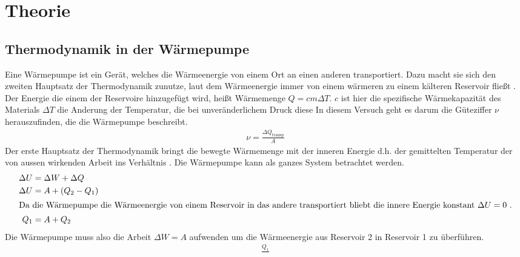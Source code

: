 \section{Theorie}

\subsection{Thermodynamik in der Wärmepumpe}
Eine Wärmepumpe ist ein Gerät, welches die Wärmeenergie von einem Ort an einen anderen transportiert.
Dazu macht sie sich den zweiten Hauptsatz der Thermodynamik zunutze, laut dem Wärmeenergie immer von einem 
wärmeren zu einem kälteren Reservoir fließt \cite[vgl][S. 321]{demtroeder}. 
Der Energie die einem der Reservoire hinzugefügt wird, heißt Wärmemenge $ Q = c m \Delta T $. %
$ c $ ist hier die spezifische Wärmekapazität des Materials $\Delta T $ die Anderung der Temperatur, 
die bei unveränderlichem Druck diese 
In diesem Versuch geht es darum die Güteziffer $ \nu $
herauszufinden, die die Wärmepumpe beschreibt.
\begin{align}
    \nu = \frac{\Delta Q_{\text{transp}}}{A}
\end{align}
Der erste Hauptsatz der Thermodynamik bringt die bewegte Wärmemenge mit der inneren Energie d.h. der gemittelten Temperatur
der von aussen wirkenden Arbeit ins Verhältnis \cite[vgl][S. 318]{demtroeder}. 
Die Wärmepumpe kann als ganzes System betrachtet werden. %
\begin{align}
                \Delta U &= \Delta W + \Delta Q \\
    \nonumber   \Delta U &= A + (Q_{2} - Q_{1}) \\
    \intertext{Da die Wärmepumpe die Wärmeenergie von einem Reservoir in das andere transportiert
    bliebt die innere Energie konstant $ \Delta U = 0 $ .} 
                Q_{1}    &= A + Q_{2} %
\end{align}
Die Wärmepumpe muss also die Arbeit $\Delta W = A$ aufwenden um die Wärmeenergie aus Reservoir 2 in Reservoir 1 zu überführen.
\begin{align}
    \frac{Q_{1}}{}
\end{align}